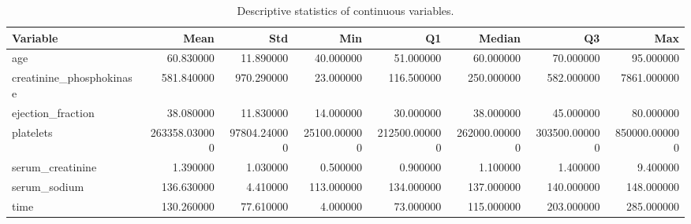 \begin{table}
\caption{Descriptive statistics of continuous variables.}
\label{tab:continuous_stats}
\begin{tabular}{lrrrrrrr}
\toprule
Variable & Mean & Std & Min & Q1 & Median & Q3 & Max \\
\midrule
age & 60.830000 & 11.890000 & 40.000000 & 51.000000 & 60.000000 & 70.000000 & 95.000000 \\
creatinine_phosphokinase & 581.840000 & 970.290000 & 23.000000 & 116.500000 & 250.000000 & 582.000000 & 7861.000000 \\
ejection_fraction & 38.080000 & 11.830000 & 14.000000 & 30.000000 & 38.000000 & 45.000000 & 80.000000 \\
platelets & 263358.030000 & 97804.240000 & 25100.000000 & 212500.000000 & 262000.000000 & 303500.000000 & 850000.000000 \\
serum_creatinine & 1.390000 & 1.030000 & 0.500000 & 0.900000 & 1.100000 & 1.400000 & 9.400000 \\
serum_sodium & 136.630000 & 4.410000 & 113.000000 & 134.000000 & 137.000000 & 140.000000 & 148.000000 \\
time & 130.260000 & 77.610000 & 4.000000 & 73.000000 & 115.000000 & 203.000000 & 285.000000 \\
\bottomrule
\end{tabular}
\end{table}
